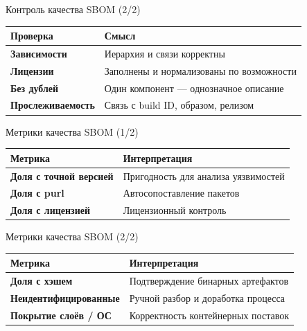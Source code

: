 \documentclass[aspectratio=169,10pt]{beamer}
\begin{document}
\begin{frame}{Контроль качества SBOM (2/2)}
\begin{table}
\scriptsize
\setlength{\tabcolsep}{2.5pt}
\begin{tabularx}{\textwidth}{>{\bfseries}p{2.9cm}Y}
\toprule
Проверка & Смысл \\
\midrule
Зависимости & Иерархия и связи корректны \\
Лицензии & Заполнены и нормализованы по возможности \\
Без дублей & Один компонент — однозначное описание \\
Прослеживаемость & Связь с build ID, образом, релизом \\
\bottomrule
\end{tabularx}
\end{table}
\end{frame}

\begin{frame}{Метрики качества SBOM (1/2)}
\begin{table}
\scriptsize
\begin{tabularx}{\textwidth}{>{\bfseries}p{3.1cm}Y}
\toprule
Метрика & Интерпретация \\
\midrule
Доля с точной версией & Пригодность для анализа уязвимостей \\
Доля с purl & Автосопоставление пакетов \\
Доля с лицензией & Лицензионный контроль \\
\bottomrule
\end{tabularx}
\end{table}
\end{frame}

\begin{frame}{Метрики качества SBOM (2/2)}
\begin{table}
\scriptsize
\begin{tabularx}{\textwidth}{>{\bfseries}p{3.1cm}Y}
\toprule
Метрика & Интерпретация \\
\midrule
Доля с хэшем & Подтверждение бинарных артефактов \\
Неидентифицированные & Ручной разбор и доработка процесса \\
Покрытие слоёв / ОС & Корректность контейнерных поставок \\
\bottomrule
\end{tabularx}
\end{table}
\end{frame}
\end{document}
